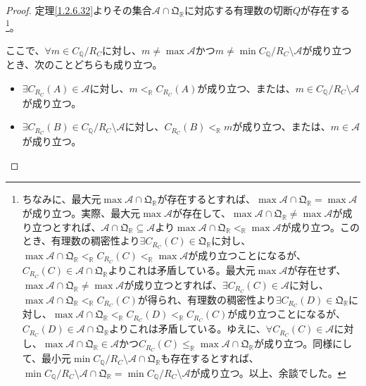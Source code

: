 \documentclass[dvipdfmx]{jsarticle}
\begin{document}
\begin{proof}
定理\ref{1.2.6.32}よりその集合$\mathcal{A \cap}\mathfrak{Q}_{\mathbb{R}}$に対応する有理数の切断$Q$が存在する\footnote{ちなみに、最大元$\max{\mathcal{A \cap}\mathfrak{Q}_{\mathbb{R}}}$が存在するとすれば、$\max{\mathcal{A \cap}\mathfrak{Q}_{\mathbb{R}}} = \max\mathcal{A}$が成り立つ。実際、最大元$\max\mathcal{A}$が存在して、$\max{\mathcal{A \cap}\mathfrak{Q}_{\mathbb{R}}} \neq \max\mathcal{A}$が成り立つとすれば、$\mathcal{A \cap}\mathfrak{Q}_{\mathbb{R}} \subseteq \mathcal{A}$より$\max{\mathcal{A \cap}\mathfrak{Q}_{\mathbb{R}}} <_{\mathbb{R}}\max\mathcal{A}$が成り立つ。このとき、有理数の稠密性より$\exists C_{R_{C}}(C) \in \mathfrak{Q}_{\mathbb{R}}$に対し、$\max{\mathcal{A \cap}\mathfrak{Q}_{\mathbb{R}}} <_{\mathbb{R}}C_{R_{C}}(C) <_{\mathbb{R}}\max\mathcal{A}$が成り立つことになるが、$C_{R_{C}}(C)\in \mathcal{A \cap}\mathfrak{Q}_{\mathbb{R}}$よりこれは矛盾している。最大元$\max\mathcal{A}$が存在せず、$\max{\mathcal{A \cap}\mathfrak{Q}_{\mathbb{R}}} \neq \max\mathcal{A}$が成り立つとすれば、$\exists C_{R_{C}}(C)\in \mathcal{A}$に対し、$\max{\mathcal{A \cap}\mathfrak{Q}_{\mathbb{R}}} <_{\mathbb{R}}C_{R_{C}}(C)$が得られ、有理数の稠密性より$\exists C_{R_{C}}(D) \in \mathfrak{Q}_{\mathbb{R}}$に対し、$\max{\mathcal{A \cap}\mathfrak{Q}_{\mathbb{R}}} <_{\mathbb{R}}C_{R_{C}}(D) <_{\mathbb{R}}C_{R_{C}}(C)$が成り立つことになるが、$C_{R_{C}}(D)\in \mathcal{A \cap}\mathfrak{Q}_{\mathbb{R}}$よりこれは矛盾している。ゆえに、$\forall C_{R_{C}}(C)\in \mathcal{A}$に対し、$\max{\mathcal{A \cap}\mathfrak{Q}_{\mathbb{R}}}\in \mathcal{A}$かつ$C_{R_{C}}(C) \leq_{\mathbb{R}}\max{\mathcal{A \cap}\mathfrak{Q}_{\mathbb{R}}}$が成り立つ。同様にして、最小元$\min{C_{\mathbb{Q}} /R_{C} \mathcal{\setminus A \cap}\mathfrak{Q}_{\mathbb{R}}}$も存在するとすれば、$\min{C_{\mathbb{Q}} /R_{C} \mathcal{\setminus A \cap}\mathfrak{Q}_{\mathbb{R}}} = \min{C_{\mathbb{Q}} /R_{C} \mathcal{\setminus A}}$が成り立つ。以上、余談でした。}。\par
ここで、$\forall m \in C_{\mathbb{Q}} /R_{C} $に対し、$m \neq \max\mathcal{A}$かつ$m \neq \min{C_{\mathbb{Q}} /R_{C} \mathcal{\setminus A}}$が成り立つとき、次のことどちらも成り立つ。
\begin{itemize}
\item
  $\exists C_{R_{C}}(A)\in \mathcal{A}$に対し、$m <_{\mathbb{R}}C_{R_{C}}(A)$が成り立つ、または、$m \in C_{\mathbb{Q}} /R_{C} \mathcal{\setminus A}$が成り立つ。
\item
  $\exists C_{R_{C}}(B) \in C_{\mathbb{Q}} /R_{C} \mathcal{\setminus A}$に対し、$C_{R_{C}}(B) <_{\mathbb{R}}m$が成り立つ、または、$m \in \mathcal{A}$が成り立つ。

\end{itemize}
\end{proof}
\end{document}
